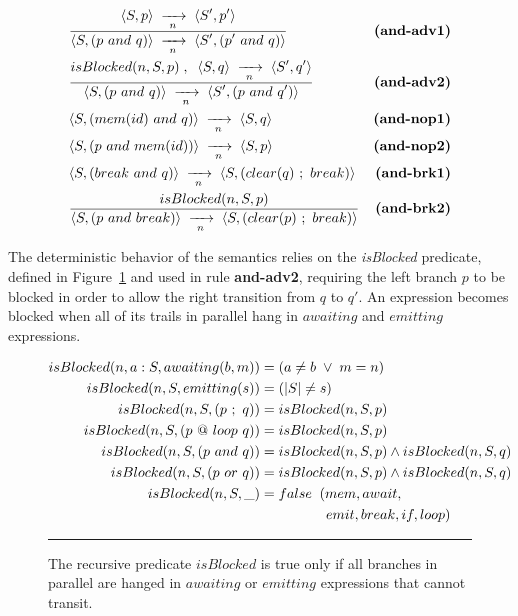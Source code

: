 { \setlength{\jot}{20pt}
\begin{eqnarray*}
& \frac
    {\displaystyle \langle S,p \rangle \;\xrightarrow[~n~]{}\; \langle S',p' \rangle }
    {\displaystyle \langle S, (p~and~q) \rangle \;\xrightarrow[~n~]{}\; \langle S', (p'~and~q) \rangle }
    & \textbf{(and-adv1)}      \\
& \frac
    {\displaystyle isBlocked(n,S,p) \;,\;\; \langle S,q \rangle \;\xrightarrow[~n~]{}\; \langle S',q' \rangle }
    {\displaystyle \langle S, (p~and~q) \rangle \;\xrightarrow[~n~]{}\; \langle S', (p~and~q') \rangle }
    & \textbf{(and-adv2)}      \\
& \langle S, (mem(id)~and~q) \rangle \;\xrightarrow[~n~]{}\; \langle S, q \rangle
    & \textbf{(and-nop1)}   \\
& \langle S, (p~and~mem(id)) \rangle \;\xrightarrow[~n~]{}\; \langle S, p \rangle
    & \textbf{(and-nop2)}   \\
& \langle S, (break~and~q) \rangle \;\xrightarrow[~n~]{}\; \langle S, (clear(q)~;~break) \rangle
    & \textbf{(and-brk1)}   \\
& \frac
    {\displaystyle isBlocked(n,S,p) }
    {\displaystyle \langle S, (p~and~break) \rangle \;\xrightarrow[~n~]{}\; \langle S, (clear(p)~;~break) \rangle }
    & \textbf{(and-brk2)}   \\
\end{eqnarray*}
}

The deterministic behavior of the semantics relies on the \emph{isBlocked} 
predicate, defined in Figure~\ref{fig.isBlocked} and used in rule 
\textbf{and-adv2}, requiring the left branch $p$ to be blocked in order to 
allow the right transition from $q$ to $q'$.
%
An expression becomes blocked when all of its trails in parallel hang in 
$awaiting$ and $emitting$ expressions.

\begin{figure}[t]
{\small
\begin{align*}
  isBlocked(n,a:S, awaiting(b,m)) &= (a \neq b \1\vee\1 m = n)   \\
  isBlocked(n,S, emitting(s))    &= (|S| \neq s)                     \\
  isBlocked(n,S, (p~;~q))        &= isBlocked(n,S,p)             \\
  isBlocked(n,S, (p~@~loop~q))   &= isBlocked(n,S,p)             \\
  isBlocked(n,S, (p~and~q))      &= isBlocked(n,S,p) \wedge
                                    isBlocked(n,S,q)             \\
  isBlocked(n,S, (p~or~q))       &= isBlocked(n,S,p) \wedge
                                    isBlocked(n,S,q)             \\
  isBlocked(n,S, \_)             &= false \2  (mem,await,      \\
                                  &    \5\5\5\2 emit,break,if,loop)   %
\end{align*}
}%
\rule{14cm}{0.37pt}
\caption{
The recursive predicate $isBlocked$ is true only if all branches in parallel 
are hanged in $awaiting$ or $emitting$ expressions that cannot transit.
\label{fig.isBlocked}
}
\end{figure}

